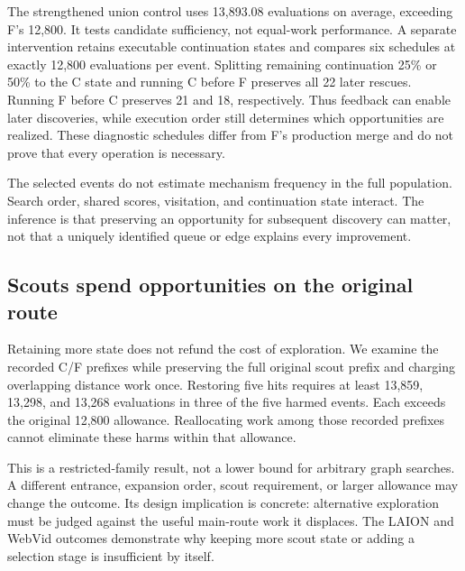 The strengthened union control uses 13,893.08 evaluations on average, exceeding F's 12,800. It tests candidate sufficiency, not equal-work performance. A separate intervention retains executable continuation states and compares six schedules at exactly 12,800 evaluations per event. Splitting remaining continuation 25\% or 50\% to the C state and running C before F preserves all 22 later rescues. Running F before C preserves 21 and 18, respectively. Thus feedback can enable later discoveries, while execution order still determines which opportunities are realized. These diagnostic schedules differ from F's production merge and do not prove that every operation is necessary.

The selected events do not estimate mechanism frequency in the full population. Search order, shared scores, visitation, and continuation state interact. The inference is that preserving an opportunity for subsequent discovery can matter, not that a uniquely identified queue or edge explains every improvement.

\subsection{Scouts spend opportunities on the original route}
Retaining more state does not refund the cost of exploration. We examine the recorded C/F prefixes while preserving the full original scout prefix and charging overlapping distance work once. Restoring five hits requires at least 13,859, 13,298, and 13,268 evaluations in three of the five harmed events. Each exceeds the original 12,800 allowance. Reallocating work among those recorded prefixes cannot eliminate these harms within that allowance.

This is a restricted-family result, not a lower bound for arbitrary graph searches. A different entrance, expansion order, scout requirement, or larger allowance may change the outcome. Its design implication is concrete: alternative exploration must be judged against the useful main-route work it displaces. The LAION and WebVid outcomes demonstrate why keeping more scout state or adding a selection stage is insufficient by itself.
